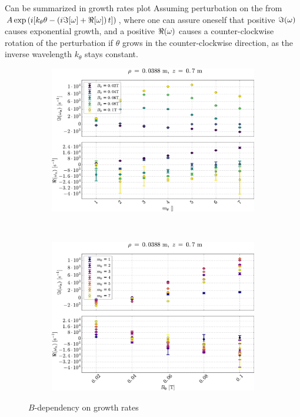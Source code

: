 %
Can be summarized in growth rates plot
Assuming perturbation on the from $A\exp\left(i[k_\theta \theta - \left(i\Im[\omega] + \Re[\omega]\right) t]\right)$, where one can assure oneself that positive $\Im(\omega)$ causes exponential growth, and a positive $\Re(\omega)$ causes a counter-clockwise rotation of the perturbation if $\theta$ grows in the counter-clockwise direction, as the inverse wavelength $k_\theta$ stays constant.
%
\begin{figure}[htbp]
    \centering
    \begin{subfigure}[h]{1.00\textwidth}
        \centering
        \includegraphics[width=1.0\textwidth]{fig/results/growthRates/growthRatesB0}
        \label{fig:grB}
    \end{subfigure}%
    \\
    \begin{subfigure}[h]{1.00\textwidth}
        \centering
        \includegraphics[width=1.0\textwidth]{fig/results/growthRates/growthRatesB0ModeNr}
        \label{fig:grBModeNr}
    \end{subfigure}
    \caption{$B$-dependency on growth rates}
\end{figure}
